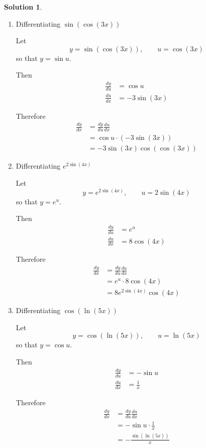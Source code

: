 \documentclass[a4paper]{article}
\theoremstyle{plain}
\theoremstyle{definition}
\newtheorem*{solution}{Solution}
\numberwithin{equation}{subsection}
\begin{document}
\begin{solution}

\begin{enumerate}
    \item Differentiating $\sin(\cos(3x))$

    Let
    \[
        y = \sin(\cos(3x)), \qquad u = \cos(3x)
    \]
    so that $y = \sin u$.

    Then
    \begin{align*}
        \frac{dy}{du} &= \cos u \\
        \frac{du}{dx} &= -3\sin(3x)
    \end{align*}

    Therefore
    \begin{align*}
        \frac{dy}{dx} &= \frac{dy}{du}\frac{du}{dx}\\
        &= \cos u \cdot (-3\sin(3x))\\
        &= -3\sin(3x)\cos(\cos(3x))
    \end{align*}

    \item Differentiating $e^{2\sin(4x)}$

    Let
    \[
        y = e^{2\sin(4x)}, \qquad u = 2\sin(4x)
    \]
    so that $y = e^u$.

    Then
    \begin{align*}
        \frac{dy}{du} &= e^u \\
        \frac{du}{dx} &= 8\cos(4x)
    \end{align*}

    Therefore
    \begin{align*}
        \frac{dy}{dx} &= \frac{dy}{du}\frac{du}{dx}\\
        &= e^u \cdot 8\cos(4x)\\
        &= 8e^{2\sin(4x)}\cos(4x)
    \end{align*}

    \item Differentiating $\cos(\ln(5x))$

    Let
    \[
        y = \cos(\ln(5x)), \qquad u = \ln(5x)
    \]
    so that $y = \cos u$.

    Then
    \begin{align*}
        \frac{dy}{du} &= -\sin u \\
        \frac{du}{dx} &= \frac{1}{x}
    \end{align*}

    Therefore
    \begin{align*}
        \frac{dy}{dx} &= \frac{dy}{du}\frac{du}{dx}\\
        &= -\sin u \cdot \frac{1}{x}\\
        &= -\frac{\sin(\ln(5x))}{x}
    \end{align*}


\end{enumerate}
\end{solution}
\end{document}
